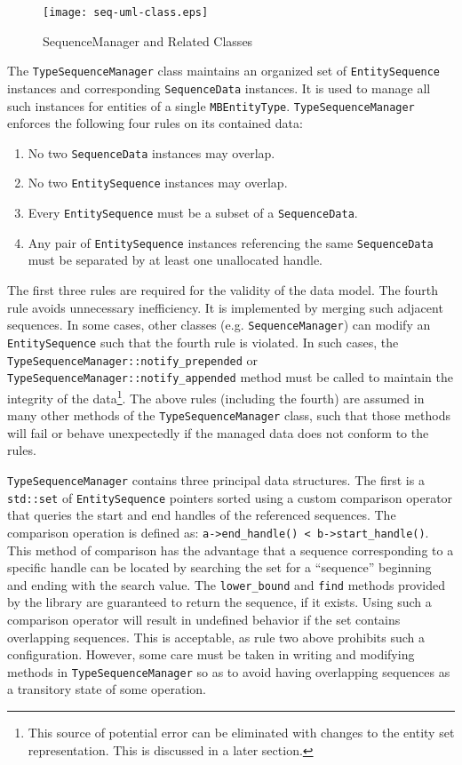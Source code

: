 \documentclass{report}
\begin{document}
\begin{figure*}[htbp]
\begin{center}
\texttt{[image: seq-uml-class.eps]}
\caption{SequenceManager and Related Classes}
\end{center}
\end{figure*}

The \texttt{TypeSequenceManager} class maintains an organized set of \texttt{EntitySequence} instances and corresponding \texttt{SequenceData} instances. It is used to manage all such instances for entities of a single \texttt{MBEntityType}.  \texttt{TypeSequenceManager} enforces the following four rules on its contained data:
\begin{enumerate}
\item No two \texttt{SequenceData} instances may overlap.
\item No two \texttt{EntitySequence} instances may overlap.
\item Every \texttt{EntitySequence} must be a subset of a \texttt{SequenceData}.
\item Any pair of \texttt{EntitySequence} instances referencing the same \texttt{SequenceData} must be separated by at least one unallocated handle.
\end{enumerate}

The first three rules are required for the validity of the data model.  The fourth rule avoids unnecessary inefficiency.  It is implemented by merging such adjacent sequences.  In some cases, other classes (e.g. \texttt{SequenceManager}) can modify an \texttt{EntitySequence} such that the fourth rule is violated.  In such cases, the \texttt{TypeSequenceManager::notify\_prepended} or \texttt{TypeSequenceManager::notify\_appended} method must be called to maintain the integrity of the data\footnote{This source of potential error can be eliminated with changes to the entity set representation.  This is discussed in a later section.}.  The above rules (including the fourth) are assumed in many other methods of the \texttt{TypeSequenceManager} class, such that those methods will fail or behave unexpectedly if the managed data does not conform to the rules.

\texttt{TypeSequenceManager} contains three principal data structures.  The first is a \texttt{std::set} of \texttt{EntitySequence} pointers sorted using a custom comparison operator that queries the start and end handles of the referenced sequences.  The comparison operation is defined as: \verb|a->end_handle() < b->start_handle()|. This method of comparison has the advantage that a sequence corresponding to a specific handle can be located by searching the set for a ``sequence'' beginning and ending with the search value.  The \texttt{lower\_bound} and \texttt{find} methods provided by the library are guaranteed to return the sequence, if it exists.  Using such a comparison operator will result in undefined behavior if the set contains overlapping sequences.  This is acceptable, as rule two above prohibits such a configuration.  However, some care must be taken in writing and modifying methods in \texttt{TypeSequenceManager} so as to avoid having overlapping sequences as a transitory state of some operation.
\end{document}
